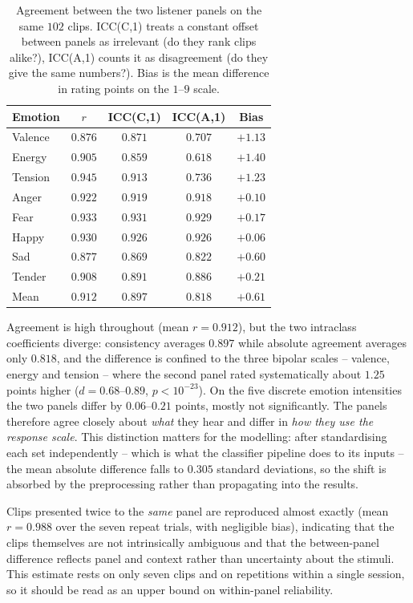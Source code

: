 \begin{table}[t]
  \centering
  \caption{Agreement between the two listener panels on the same $102$ clips.
    ICC(C,1) treats a constant offset between panels as irrelevant (do they rank
    clips alike?), ICC(A,1) counts it as disagreement (do they give the same
    numbers?). Bias is the mean difference in rating points on the $1$--$9$ scale.}
  \label{tab:rating_reliability}
  \begin{tabular}{lcccc}
    \hline
    Emotion & $r$ & ICC(C,1) & ICC(A,1) & Bias \\
    \hline
    Valence & $0.876$ & $0.871$ & $0.707$ & $+1.13$ \\
    Energy  & $0.905$ & $0.859$ & $0.618$ & $+1.40$ \\
    Tension & $0.945$ & $0.913$ & $0.736$ & $+1.23$ \\
    Anger   & $0.922$ & $0.919$ & $0.918$ & $+0.10$ \\
    Fear    & $0.933$ & $0.931$ & $0.929$ & $+0.17$ \\
    Happy   & $0.930$ & $0.926$ & $0.926$ & $+0.06$ \\
    Sad     & $0.877$ & $0.869$ & $0.822$ & $+0.60$ \\
    Tender  & $0.908$ & $0.891$ & $0.886$ & $+0.21$ \\
    \hline
    Mean    & $0.912$ & $0.897$ & $0.818$ & $+0.61$ \\
    \hline
  \end{tabular}
\end{table}

Agreement is high throughout (mean $r=0.912$), but the two intraclass coefficients
diverge: consistency averages $0.897$ while absolute agreement averages only $0.818$, and
the difference is confined to the three bipolar scales -- valence, energy and tension --
where the second panel rated systematically about $1.25$ points higher
($d=0.68$--$0.89$, $p<10^{-23}$). On the five discrete emotion intensities the two panels
differ by $0.06$--$0.21$ points, mostly not significantly. The panels therefore agree
closely about \emph{what} they hear and differ in \emph{how they use the response scale}.
This distinction matters for the modelling: after standardising each set independently --
which is what the classifier pipeline does to its inputs -- the mean absolute difference
falls to $0.305$ standard deviations, so the shift is absorbed by the preprocessing rather
than propagating into the results.

Clips presented twice to the \emph{same} panel are reproduced almost exactly (mean
$r=0.988$ over the seven repeat trials, with negligible bias), indicating that the
clips themselves are not intrinsically ambiguous and that the between-panel difference
reflects panel and context rather than uncertainty about the stimuli. This estimate rests
on only seven clips and on repetitions within a single session, so it should be read as
an upper bound on within-panel reliability.

